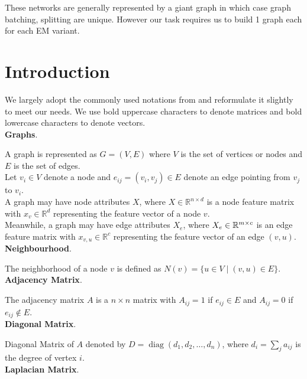 \documentclass{report} %
\begin{document}
These networks are generally represented by a giant graph in which case graph batching, splitting are unique.
However our task requires us to build 1 graph each for each \ac{EM} variant.

\section{Introduction}\label{sec:Introduction}

We largely adopt the commonly used notations from \cite{GNN-2019} and reformulate it slightly to meet our needs.
We use bold uppercase characters to denote matrices and bold lowercase characters to denote vectors.\\

\textbf{Graphs}. 

A graph is represented as \( G = (V, E) \) where \( V \) is the set of vertices or nodes  and \( E \) is the set of edges. \\
Let \( v_i \in V \) denote a node and \( e_{ij} = (v_i, v_j) \in E \) denote an edge pointing from \( v_j \) to \( v_i \). \\
A graph may have node attributes \( X \), where \( X \in \mathbb{R}^{n \times d} \) is a node feature matrix with 
\( x_v \in \mathbb{R}^d \) representing the feature vector of a node \( v \). \\
Meanwhile, a graph may have edge attributes \( X_e \), where \( X_e \in \mathbb{R}^{m \times \\c} \) is an edge
feature matrix with \( x_{v,u} \in \mathbb{R}^c \) representing the feature vector of an edge \( (v, u) \).\\

\textbf{Neighbourhood}. 

The neighborhood of a node \( v \) is defined as \( N(v) = \{ u \in V \mid (v, u) \in E \} \).\\

\textbf{Adjacency Matrix}. 

The adjacency matrix \( A \) is a \( n \times n \) matrix with \( A_{ij} = 1 \) if \( e_{ij} \in E \) and \( A_{ij} = 0 \) if \( e_{ij} \notin E \).\\

\textbf{Diagonal Matrix}. 

Diagonal Matrix of \( A \) denoted by  \( D = \operatorname{diag}(d_1, d_2, \dots, d_n) \), where \( d_i = \sum_{j} a_{ij} \) is the degree of vertex \( i \).\\

\textbf{Laplacian Matrix}. 
\end{document}
